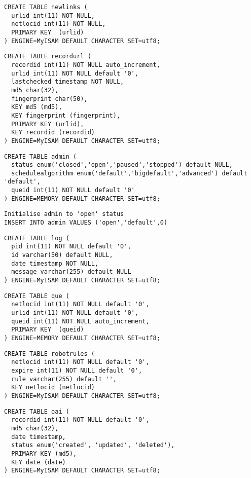 \begin{verbatim}
CREATE TABLE newlinks (
  urlid int(11) NOT NULL,
  netlocid int(11) NOT NULL,
  PRIMARY KEY  (urlid)
) ENGINE=MyISAM DEFAULT CHARACTER SET=utf8;
\end{verbatim}

\begin{verbatim}
CREATE TABLE recordurl (
  recordid int(11) NOT NULL auto_increment,
  urlid int(11) NOT NULL default '0',
  lastchecked timestamp NOT NULL,
  md5 char(32),
  fingerprint char(50),
  KEY md5 (md5),
  KEY fingerprint (fingerprint),
  PRIMARY KEY (urlid),
  KEY recordid (recordid)
) ENGINE=MyISAM DEFAULT CHARACTER SET=utf8;
\end{verbatim}

\begin{verbatim}
CREATE TABLE admin (
  status enum('closed','open','paused','stopped') default NULL,
  schedulealgorithm enum('default','bigdefault','advanced') default 'default',
  queid int(11) NOT NULL default '0'
) ENGINE=MEMORY DEFAULT CHARACTER SET=utf8;
\end{verbatim}

\verb+Initialise admin to 'open' status+\\
\verb+INSERT INTO admin VALUES ('open','default',0)+\\
\begin{verbatim}
CREATE TABLE log (
  pid int(11) NOT NULL default '0',
  id varchar(50) default NULL,
  date timestamp NOT NULL,
  message varchar(255) default NULL
) ENGINE=MyISAM DEFAULT CHARACTER SET=utf8;
\end{verbatim}

\begin{verbatim}
CREATE TABLE que (
  netlocid int(11) NOT NULL default '0',
  urlid int(11) NOT NULL default '0',
  queid int(11) NOT NULL auto_increment,
  PRIMARY KEY  (queid)
) ENGINE=MEMORY DEFAULT CHARACTER SET=utf8;
\end{verbatim}

\begin{verbatim}
CREATE TABLE robotrules (
  netlocid int(11) NOT NULL default '0',
  expire int(11) NOT NULL default '0',
  rule varchar(255) default '',
  KEY netlocid (netlocid)
) ENGINE=MyISAM DEFAULT CHARACTER SET=utf8;
\end{verbatim}

\begin{verbatim}
CREATE TABLE oai (
  recordid int(11) NOT NULL default '0',
  md5 char(32),
  date timestamp,
  status enum('created', 'updated', 'deleted'),
  PRIMARY KEY (md5),
  KEY date (date)
) ENGINE=MyISAM DEFAULT CHARACTER SET=utf8;
\end{verbatim}

